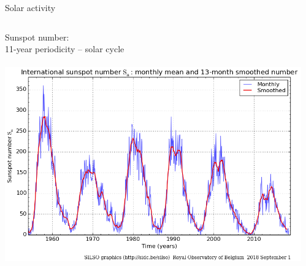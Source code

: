 \begin{frame}[plain,c]{Solar activity}{}
\begin{columns}[c]
		
		Sunspot number:\\
		11-year periodicity -- solar cycle\\\ 
		\includegraphics[width=\textwidth]{../figures_of_others/images/ROB_SILSO_SSN_wolfmms_cropped.png}

		\vfill\hfill \hyperlink{butterfly}{\beamerskipbutton{}}
		
	\end{columns}
\end{frame}
